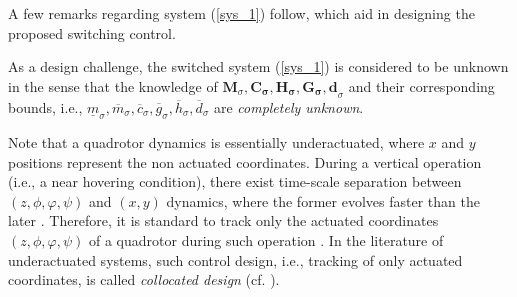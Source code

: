 A few remarks regarding system (\ref{sys_1}) follow, which aid in designing the proposed switching control. 
\begin{remark}[(Uncertainty)]
	As a design challenge, the switched system (\ref{sys_1}) is considered to be unknown in the sense that the knowledge of $\mathbf{M}_\sigma,\mathbf{C_\sigma,H_\sigma, G_\sigma, d}_{\sigma}$ and their corresponding bounds, i.e., $\underline{m}_{\sigma}, \overline{m}_{\sigma}, \overline c_{\sigma }, \overline g_{\sigma }, \overline h_{\sigma },\overline{d}_{\sigma}$ are \textit{completely unknown}. 
\end{remark}
\begin{remark}\label{remark_collocated}
	Note that a quadrotor dynamics is essentially underactuated, where $x$ and $y$ positions represent the non actuated coordinates. During a vertical operation (i.e., a near hovering condition), there exist time-scale separation between $(z, \phi, \varphi, \psi)$ and $(x,y)$ dynamics, where the former evolves faster than the later \cite{dydek2012adaptive}. Therefore, it is standard to track only the actuated coordinates $(z, \phi, \varphi, \psi )$ of a quadrotor during such operation \cite{mofid2018adaptive, nicol2011robust}. In the literature of underactuated systems, such control design, i.e., tracking of only actuated coordinates, is called \textit{collocated design} (cf. \cite{shkolnik2008high,spong1994partial}). %
\end{remark}
